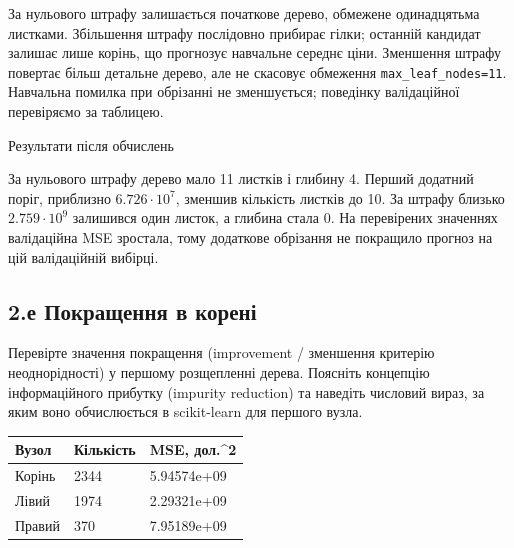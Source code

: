 За нульового штрафу залишається початкове дерево, обмежене одинадцятьма
листками. Збільшення штрафу послідовно прибирає гілки; останній кандидат
залишає лише корінь, що прогнозує навчальне середнє ціни. Зменшення
штрафу повертає більш детальне дерево, але не скасовує обмеження
\texttt{max\_leaf\_nodes=11}. Навчальна помилка при обрізанні не
зменшується; поведінку валідаційної перевіряємо за таблицею.

Результати після обчислень

За нульового штрафу дерево мало 11 листків і глибину 4. Перший додатний
поріг, приблизно \(6.726\cdot10^7\), зменшив кількість листків до 10. За
штрафу близько \(2.759\cdot10^9\) залишився один листок, а глибина стала
0. На перевірених значеннях валідаційна MSE зростала, тому додаткове
обрізання не покращило прогноз на цій валідаційній вибірці.


\Needspace{310pt}

\subsection{2.е Покращення в корені}

\begin{taskstatement}Перевірте значення покращення (improvement / зменшення критерію
неоднорідності) у першому розщепленні дерева. Поясніть концепцію
інформаційного прибутку (impurity reduction) та наведіть числовий вираз,
за яким воно обчислюється в scikit-learn для першого вузла.
\end{taskstatement}


\Needspace{19.2pt}


\Needspace{69pt}
\begingroup\fontsize{7.5}{9.5}\selectfont\setlength{\tabcolsep}{2.5mm}\renewcommand{\arraystretch}{1.12}\par\noindent\begin{tabular}{|lll|}
\hline
Вузол & Кількість & MSE, дол.\textasciicircum{}2 \\
\hline
Корінь & 2344 & 5.94574e+09 \\
Лівий & 1974 & 2.29321e+09 \\
Правий & 370 & 7.95189e+09 \\
\hline
\end{tabular}
\par\endgroup


\Needspace{37.599999999999994pt}


